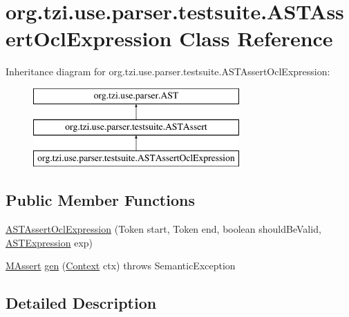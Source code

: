 \hypertarget{classorg_1_1tzi_1_1use_1_1parser_1_1testsuite_1_1_a_s_t_assert_ocl_expression}{\section{org.\-tzi.\-use.\-parser.\-testsuite.\-A\-S\-T\-Assert\-Ocl\-Expression Class Reference}
\label{classorg_1_1tzi_1_1use_1_1parser_1_1testsuite_1_1_a_s_t_assert_ocl_expression}
}
Inheritance diagram for org.\-tzi.\-use.\-parser.\-testsuite.\-A\-S\-T\-Assert\-Ocl\-Expression\-:\begin{figure}[H]
\begin{center}
\leavevmode
\includegraphics[height=3.000000cm]{classorg_1_1tzi_1_1use_1_1parser_1_1testsuite_1_1_a_s_t_assert_ocl_expression}
\end{center}
\end{figure}
\subsection*{Public Member Functions}
\begin{DoxyCompactItemize}
\item 
\hyperlink{classorg_1_1tzi_1_1use_1_1parser_1_1testsuite_1_1_a_s_t_assert_ocl_expression_a0cec5f550fc53847437be8a606b63cb8}{A\-S\-T\-Assert\-Ocl\-Expression} (Token start, Token end, boolean should\-Be\-Valid, \hyperlink{classorg_1_1tzi_1_1use_1_1parser_1_1ocl_1_1_a_s_t_expression}{A\-S\-T\-Expression} exp)
\item 
\hyperlink{classorg_1_1tzi_1_1use_1_1uml_1_1sys_1_1testsuite_1_1_m_assert}{M\-Assert} \hyperlink{classorg_1_1tzi_1_1use_1_1parser_1_1testsuite_1_1_a_s_t_assert_ocl_expression_a11ccbeedc7f1445cf9e5fbdaab457ebd}{gen} (\hyperlink{classorg_1_1tzi_1_1use_1_1parser_1_1_context}{Context} ctx)  throws Semantic\-Exception 
\end{DoxyCompactItemize}


\subsection{Detailed Description}


